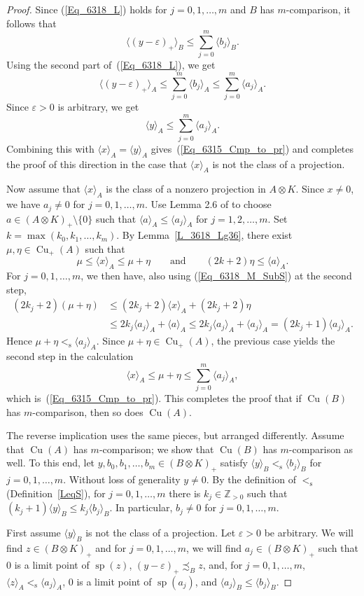 \documentclass[10pt]{amsart}
\numberwithin{equation}{section}
\theoremstyle{definition}
\newcommand{\ep}{\varepsilon}
\newcommand{\N}{{\mathbb{Z}}_{> 0}}
\newcommand{\spec}{{\operatorname{sp}}}
\newcommand{\Cu}{{\operatorname{Cu}}}
\newcommand{\andeqn}{\qquad {\mbox{and}} \qquad}
\newcommand{\Wolog}{Without loss of generality}
\newcommand{\pj}{projection}
\newcommand{\cc}[1]{\langle #1 \rangle}
\newcommand{\ccA}[1]{\langle #1 \rangle_A}
\newcommand{\ccB}[1]{\langle #1 \rangle_B}
\newcommand{\les}{<_{\operatorname{s}}}
\begin{document}
\begin{proof}
Since (\ref{Eq_6318_L}) holds for $j = 0, 1, \ldots, m$
and $B$ has $m$-comparison, it follows that
\[
\ccB{(y - \ep)_{+}} \leq \sum_{j = 0}^m \ccB{b_j}.
\]
Using the second part of~(\ref{Eq_6318_L}), we get
\[
\ccA{(y - \ep)_{+}}
 \leq \sum_{j = 0}^m \ccA{b_j}
 \leq \sum_{j = 0}^m \ccA{a_j}.
\]
Since $\ep > 0$ is arbitrary, we get
\[
\ccA{y} \leq \sum_{j = 0}^m \ccA{a_j}.
\]
Combining this with $\ccA{x} = \ccA{y}$ gives~(\ref{Eq_6315_Cmp_to_pr})
and completes the proof of this direction in the case that $\ccA{x}$
is not the class of a \pj.

Now assume that $\cc{x}_A$ is the class of a nonzero
projection in $A \otimes K$.
Since $x \neq 0$, we have $a_j \neq 0$ for $j = 0, 1, \ldots, m$.
Use Lemma 2.6 of \cite{Phl40} to choose
$a \in (A \otimes K)_{+} \setminus \{0\}$ such that
$\cc{a}_A \leq \cc{a_j}_A$ for $j = 1, 2, \hdots, m$.
Set $k = \max ( k_0, k_1, \ldots, k_m )$.
By Lemma~\ref{L_3618_Lg36}, there exist $\mu, \eta \in \Cu_{+} (A)$
such that
\[
\mu \leq \cc{x}_A \leq \mu + \eta
\andeqn
(2 k + 2) \eta \leq \cc{a}_A.
\]
For $j = 0, 1, \hdots, m$, we then have,
also using (\ref{Eq_6318_M_SubS}) at the second step,
\[
\begin{split}
(2 k_j + 2) (\mu + \eta)
& \leq (2 k_j + 2) \cc{x}_A + (2 k_j + 2) \eta
\\
& \leq 2 k_j \cc{a_j}_A + \cc{a}_A
  \leq 2 k_j \cc{a_j}_A + \cc{a_j}_A
  = (2 k_j + 1) \cc{a_j}_A.
\end{split}
\]
Hence $\mu + \eta \les \cc{a_j}_A$.
Since $\mu + \eta \in \Cu_{+} (A)$, the previous case yields
the second step in the calculation
\[
\cc{x}_A \leq \mu + \eta \leq \sum_{j = 0}^m \cc{a_j}_A,
\]
which is~(\ref{Eq_6315_Cmp_to_pr}).
This completes the proof that if $\Cu (B)$ has
$m$-comparison, then so does $\Cu (A)$.

The reverse implication uses the same pieces, but arranged differently.
Assume that $\Cu (A)$ has $m$-comparison;
we show that $\Cu (B)$ has $m$-comparison as well.
To this end, let
$y, b_0, b_1, \ldots, b_m \in (B \otimes K)_{+}$ satisfy
$\cc{y}_B \les \cc{b_j}_B$ for $j = 0, 1, \ldots, m$.
\Wolog{} $y \neq 0$.
By the definition of $\les$ (Definition~\ref{LeqS}),
for $j = 0, 1, \ldots, m$ there is $k_j \in \N$
such that $(k_j + 1) \ccB{y} \leq k_j \ccB{b_j}$.
In particular, $b_j \neq 0$ for $j = 0, 1, \ldots, m$.

First assume $\cc{y}_B$ is not the class of a projection.
Let $\varepsilon > 0$ be arbitrary. We will find $z \in (B \otimes K)_{+}$
and for $j = 0, 1, \ldots, m$, we will find $a_j \in (B \otimes K)_{+}$
such that $0$ is a limit point of $\spec (z)$,
$(y - \ep)_{+} \precsim_B z$,
and, for $j = 0, 1, \ldots, m$, $\ccA{z} \les \ccA{a_j}$,
$0$ is a limit point of $\spec (a_j)$, and $\ccB{a_j} \leq \ccB{b_j}$.


\end{proof}
\end{document}
